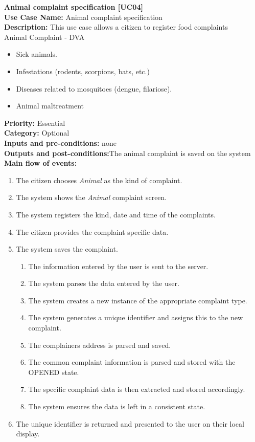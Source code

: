 \documentclass[11pt,twoside]{article}
\begin{document}
\textbf{Animal complaint specification [UC04]}\\
\textbf{Use Case Name:} Animal complaint specification \\
\textbf{Description:} This use case allows a citizen to register food complaints\\
Animal Complaint - DVA
\begin{itemize}
\item Sick animals.
\item Infestations (rodents, scorpions, bats, etc.)
\item Diseases related to mosquitoes (dengue, filariose).
\item Animal maltreatment
\end{itemize}
\textbf{Priority:} Essential \\
\textbf{Category:} Optional \\
\textbf{Inputs and pre-conditions:} none\\
\textbf{Outputs and post-conditions:}The animal complaint is saved on the system\\
\textbf{Main flow of events:}\\
\begin{enumerate}
\item The citizen chooses \textit{Animal} as the kind of complaint.
\item The system shows the \textit{Animal} complaint screen.
\item The system registers the kind, date and time of the complaints.
\item The citizen provides the complaint specific data.
\item The system saves the complaint.
\begin{enumerate}
\item The information entered by the user is sent to the server.
\item The system parses the data entered by the user.
\item The system creates a new instance of the appropriate complaint
type.
\item The system generates a unique identifier and assigns this to the new
complaint.
\item The complainers address is parsed and saved.
\item The common complaint information is parsed and stored with the
OPENED state.
\item The specific complaint data is then extracted and stored accordingly.
\item The system ensures the data is left in a consistent state.
\end{enumerate}
\item The unique identifier is returned and presented to the user on their local
display.
\end{enumerate}
\end{document}
